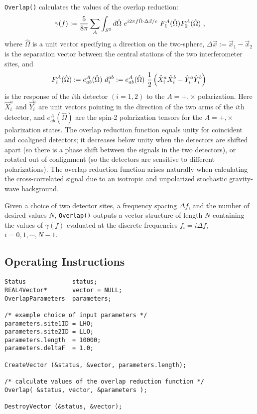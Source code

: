 \documentclass{article}
\begin{document}
{\tt Overlap()\/} calculates the values of the overlap reduction:
%
\begin{equation}
\gamma(f):={5\over 8\pi}\sum_A\int_{S^2}d\hat\Omega\
e^{i2\pi f\hat\Omega\cdot\Delta \vec x/c}\ 
F_1^A(\hat\Omega)F_2^A(\hat\Omega)\ ,
\label{e:gamma(f)}
\end{equation}
%
where $\hat \Omega$ is a unit vector specifying a direction on the 
two-sphere, $\Delta\vec x:=\vec x_1-\vec x_2$ is the separation vector 
between the central stations of the two interferometer sites, and 
%
\begin{equation}
F_i^A(\hat\Omega):=e_{ab}^A(\hat\Omega)\ d_i^{ab}:=
e_{ab}^A(\hat\Omega)\ {1\over 2}\left(\hat X_i^a\hat X_i^b-
\hat Y_i^a\hat Y_i^b\right)\ 
\label{e:F_i^A}
\end{equation}
%
is the response of the $i$th detector $(i=1,2)$ to the $A=+,\times$ 
polarization.  
Here $\hat X_i^a$ and $\hat Y_i^a$ are unit vectors pointing in the
direction of the two arms of the $i$th detector, and 
$e_{ab}^A(\hat\Omega)$ are the spin-2 polarization tensors for the
$A=+,\times$ polarization states.
The overlap reduction function equals unity for coincident and coaligned 
detectors; it decreases below unity when the detectors are shifted apart 
(so there is a phase shift between the signals in the 
two detectors), or  rotated out of coalignment (so the detectors are 
sensitive to different polarizations).
The overlap reduction function arises naturally when calculating the 
cross-correlated signal due to an isotropic and unpolarized stochastic 
gravity-wave background.

Given a choice of two detector sites, a frequency spacing $\Delta f$,
and the number of desired values $N$, {\tt Overlap()\/} outputs a
vector structure of length $N$ containing the values of $\gamma(f)$ 
evaluated at the discrete frequencies $f_i=i\Delta f$, $i=0,1,\cdots, N-1$.

\subsection{Operating Instructions}

\begin{verbatim}
Status             status; 
REAL4Vector*       vector = NULL;
OverlapParameters  parameters;

/* example choice of input parameters */
parameters.site1ID = LHO;
parameters.site2ID = LLO;
parameters.length  = 10000;
parameters.deltaF  = 1.0;

CreateVector (&status, &vector, parameters.length);

/* calculate values of the overlap reduction function */
Overlap( &status, vector, &parameters );

DestroyVector (&status, &vector);
\end{verbatim}
\end{document}
